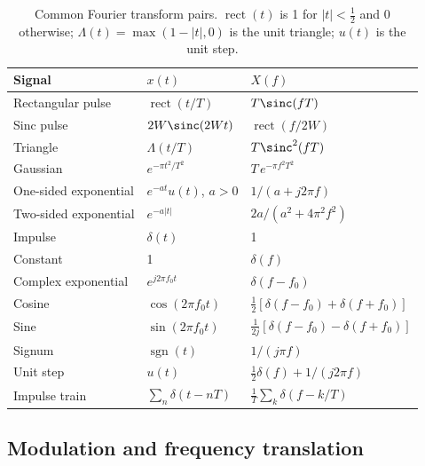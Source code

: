 
\begin{table}[htbp]\centering\small
\caption{Common Fourier transform pairs. $\operatorname{rect}(t)$ is 1 for $|t|<\tfrac12$ and 0
otherwise; $\Lambda(t)=\max(1-|t|,0)$ is the unit triangle; $u(t)$ is the unit step.}
\label{tab:ch02:pairs}
\begin{tabular}{@{}lll@{}}
\toprule
Signal & $x(t)$ & $X(f)$\\
\midrule
Rectangular pulse & $\operatorname{rect}(t/T)$ & $T\sinc(fT)$\\
Sinc pulse & $2W\sinc(2Wt)$ & $\operatorname{rect}(f/2W)$\\
Triangle & $\Lambda(t/T)$ & $T\sinc^2(fT)$\\
Gaussian & $e^{-\pi t^2/T^2}$ & $T\,e^{-\pi f^2T^2}$\\
One-sided exponential & $e^{-at}u(t)$, $a>0$ & $1/(a+j2\pi f)$\\
Two-sided exponential & $e^{-a|t|}$ & $2a/(a^2+4\pi^2f^2)$\\
Impulse & $\delta(t)$ & 1\\
Constant & 1 & $\delta(f)$\\
Complex exponential & $e^{j2\pi f_0t}$ & $\delta(f-f_0)$\\
Cosine & $\cos(2\pi f_0t)$ & $\tfrac12[\delta(f-f_0)+\delta(f+f_0)]$\\
Sine & $\sin(2\pi f_0t)$ & $\tfrac1{2j}[\delta(f-f_0)-\delta(f+f_0)]$\\
Signum & $\operatorname{sgn}(t)$ & $1/(j\pi f)$\\
Unit step & $u(t)$ & $\tfrac12\delta(f)+1/(j2\pi f)$\\
Impulse train & $\sum_n\delta(t-nT)$ & $\frac1T\sum_k\delta(f-k/T)$\\
\bottomrule
\end{tabular}
\end{table}

\subsection{Modulation and frequency translation}
\label{sec:ch02:modthm}

